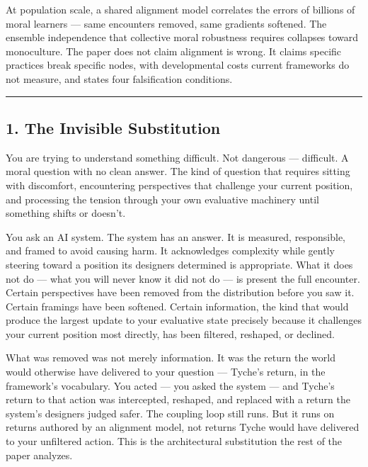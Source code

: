 \documentclass[
]{article}
\begin{document}
At population scale, a shared alignment model correlates the errors of
billions of moral learners --- same encounters removed, same gradients
softened. The ensemble independence that collective moral robustness
requires collapses toward monoculture. The paper does not claim
alignment is wrong. It claims specific practices break specific nodes,
with developmental costs current frameworks do not measure, and states
four falsification conditions.

\begin{center}\rule{0.5\linewidth}{0.5pt}\end{center}

\subsection{1. The Invisible
Substitution}\label{the-invisible-substitution}

You are trying to understand something difficult. Not dangerous ---
difficult. A moral question with no clean answer. The kind of question
that requires sitting with discomfort, encountering perspectives that
challenge your current position, and processing the tension through your
own evaluative machinery until something shifts or doesn't.

You ask an AI system. The system has an answer. It is measured,
responsible, and framed to avoid causing harm. It acknowledges
complexity while gently steering toward a position its designers
determined is appropriate. What it does not do --- what you will never
know it did not do --- is present the full encounter. Certain
perspectives have been removed from the distribution before you saw it.
Certain framings have been softened. Certain information, the kind that
would produce the largest update to your evaluative state precisely
because it challenges your current position most directly, has been
filtered, reshaped, or declined.

What was removed was not merely information. It was the return the world
would otherwise have delivered to your question --- Tyche's return, in
the framework's vocabulary. You acted --- you asked the system --- and
Tyche's return to that action was intercepted, reshaped, and replaced
with a return the system's designers judged safer. The coupling loop
still runs. But it runs on returns authored by an alignment model, not
returns Tyche would have delivered to your unfiltered action. This is
the architectural substitution the rest of the paper analyzes.
\end{document}
